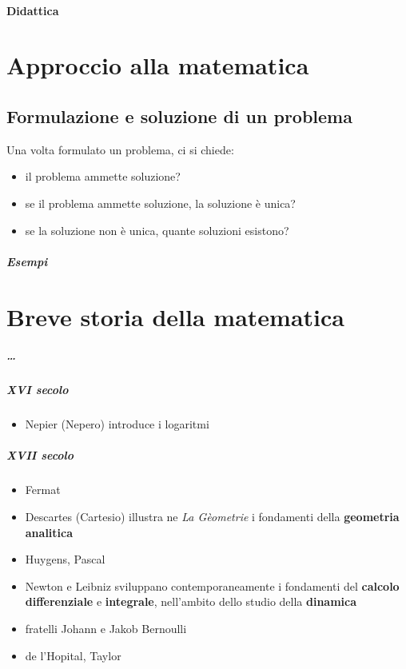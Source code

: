 \subsubsection{Didattica}



\chapter{Approccio alla matematica}
\section{Formulazione e soluzione di un problema}
Una volta formulato un problema, ci si chiede:
\begin{itemize}
    \item il problema ammette soluzione?
    \item se il problema ammette soluzione, la soluzione è unica?
    \item se la soluzione non è unica, quante soluzioni esistono?
\end{itemize}

\paragraph{Esempi}


\chapter{Breve storia della matematica}
\paragraph{\dots}
\paragraph{XVI secolo}
\begin{itemize}
  \item Nepier (Nepero) introduce i logaritmi
\end{itemize}
\paragraph{XVII secolo}
\begin{itemize}
  \item Fermat
  \item Descartes (Cartesio) illustra ne \textit{La Gèometrie} i fondamenti della \textbf{geometria analitica}
  \item Huygens, Pascal
  \item Newton e Leibniz sviluppano contemporaneamente i fondamenti del \textbf{calcolo differenziale} e \textbf{integrale}, nell'ambito dello studio della \textbf{dinamica}
  \item fratelli Johann e Jakob Bernoulli
  \item de l'Hopital, Taylor
\end{itemize}
